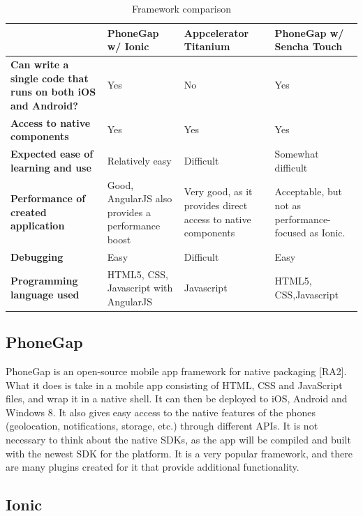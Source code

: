 \begin{table}[!h]
	\caption{Framework comparison}
		\begin{tabular}{ | p{6cm} | >{\raggedright}p{3cm} | >{\raggedright}p{3cm} | p{4cm} |}
			\hline
			\textbf{} & \textbf{PhoneGap w/ Ionic} & \textbf{Appcelerator Titanium} & \textbf{PhoneGap w/ Sencha Touch} \\ \hline
			\textbf{Can write a single code that runs on both iOS and Android?} & Yes & No & Yes \\ \hline
			\textbf{Access to native components} & Yes & Yes & Yes \\ \hline
			\textbf{Expected ease of learning and use} & Relatively easy & Difficult & Somewhat difficult \\ \hline
			\textbf{Performance of created application} & Good, AngularJS also provides a performance boost & Very good, as it provides direct access to native components & Acceptable, but not as performance- focused as Ionic. \\ \hline
			\textbf{Debugging} & Easy & Difficult & Easy \\ \hline
			\textbf{Programming language used} & HTML5, CSS, Javascript with AngularJS & Javascript & HTML5, CSS,\newline Javascript \\ \hline
		\end{tabular}
	\label{Tab:framework}
\end{table}

\subsection{PhoneGap}
\label{subsec:phonegap}

PhoneGap is an open-source mobile app framework for native packaging [RA2]. What it does is take in a mobile app consisting of HTML, CSS and JavaScript files, and wrap it in a native shell. It can then be deployed to iOS, Android and Windows 8. It also gives easy access to the native features of the phones (geolocation, notifications, storage, etc.) through different APIs. It is not necessary to think about the native SDKs, as the app will be compiled and built with the newest SDK for the platform.  It is a very popular framework, and there are many plugins created for it that provide additional functionality.

\subsection{Ionic}
\label{subsec:ionic}

